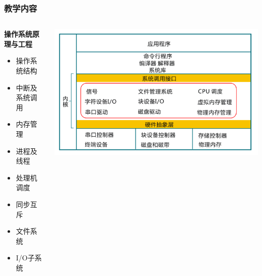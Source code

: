 \documentclass[UTF8]{ctexbeamer}
\begin{document}
\begin{frame}
	\frametitle{教学内容}

	\begin{columns}
	
	\begin{column}{0.5\textwidth}
	\textbf{操作系统原理与工程}
    \begin{itemize}
		\item 操作系统结构
		\item 中断及系统调用
		\item 内存管理
		\item 进程及线程
		\item 处理机调度
		\item 同步互斥
		\item 文件系统
		\item I/O子系统
    \end{itemize}
    
    \end{column}

	\begin{column}{0.5\textwidth}
	
    \includegraphics[width=1\linewidth]{ucore-arch}
    
    \end{column}
    
\end{columns}

\end{frame}

\end{document}
